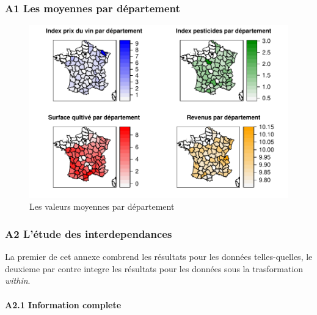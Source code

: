 \documentclass[11pt,]{article}
\let\oldparagraph\paragraph
\renewcommand{\paragraph}[1]{\oldparagraph{#1}\mbox{}}
\begin{document}
\hypertarget{a1-les-moyennes-par-departement}{%
\subsubsection{A1 Les moyennes par
département}\label{a1-les-moyennes-par-departement}}

\FloatBarrier

\begin{figure}[!htbp]

{\centering \includegraphics{note2pres_files/figure-latex/unnamed-chunk-51-1} 

}

\caption{Les valeurs moyennes par département}\label{fig:unnamed-chunk-51}
\end{figure}

\FloatBarrier

\newpage

\hypertarget{a2-letude-des-interdependances}{%
\subsubsection{A2 L'étude des
interdependances}\label{a2-letude-des-interdependances}}

La premier de cet annexe combrend les résultats pour les données
telles-quelles, le deuxieme par contre integre les résultats pour les
données sous la trasformation \emph{within}.

\hypertarget{a2.1-information-complete}{%
\paragraph{A2.1 Information complete}\label{a2.1-information-complete}}
\end{document}
